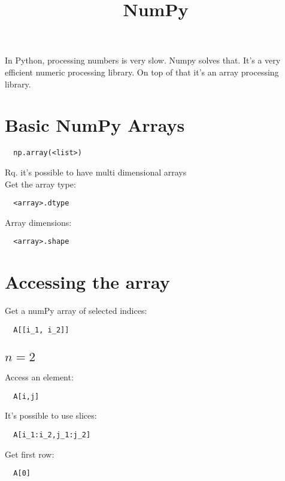 \documentclass[french]{article}
\title{NumPy}
\begin{document}
\date{}

\maketitle


In Python, processing numbers is very slow. Numpy solves that. It's a very efficient numeric processing library. On top of that it's an array processing library.

\setlength{\parindent}{0cm}

\section{Basic NumPy Arrays}

\begin{verbatim}
  np.array(<list>)
\end{verbatim}

Rq. it's possible to have multi dimensional arrays\\

Get the array type:
\begin{verbatim}
  <array>.dtype
\end{verbatim}

Array dimensions:
\begin{verbatim}
  <array>.shape
\end{verbatim}

\section{Accessing the array}

Get a numPy array of selected indices:
\begin{verbatim}
  A[[i_1, i_2]]
\end{verbatim}

\subsection{$n=2$}
Access an element:
\begin{verbatim}
  A[i,j]
\end{verbatim}

It's possible to use slices:
\begin{verbatim}
  A[i_1:i_2,j_1:j_2]
\end{verbatim}

Get first row:
\begin{verbatim}
  A[0]
\end{verbatim}
\end{document}
